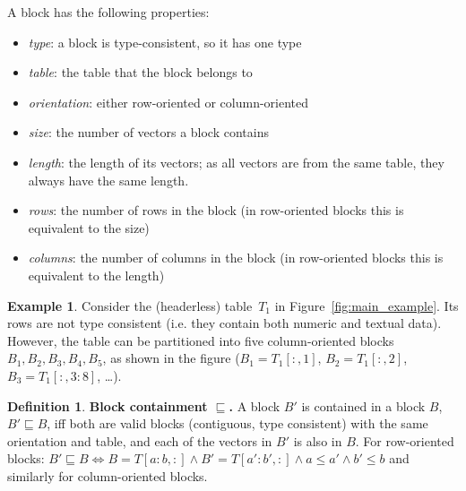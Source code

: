 \documentclass{IEEEtran}
\newcommand{\range}[3]{\ensuremath{#1[#2,#3]}}
\newcommand{\rangeto}[2]{#1{:}#2}
\newcommand{\rangeall}{:}
\newcommand{\sbs}{B}
\newcommand{\sbl}[1]{\ensuremath{\sbs_{\textit{#1}}}}
\theoremstyle{definition}
\newtheorem{definition}{Definition}
\newtheorem{example}{Example}
\begin{document}
A block has the following properties:
\begin{itemize}
\item \textit{type}: a block is type-consistent, so it has one type
\item \textit{table}: the table that the block belongs to
\item \textit{orientation}: either row-oriented or column-oriented
\item \textit{size}: the number of vectors a block contains
\item \textit{length}: the length of its vectors; as all vectors are from the same table, they always have the same length.
\item \textit{rows}: the number of rows in the block
(in row-oriented blocks this is equivalent to the size)
\item \textit{columns}: the number of columns in the block (in row-oriented blocks this is equivalent to the length)
\end{itemize}



\begin{example}
Consider the (headerless) table~$T_1$ in Figure~\ref{fig:main_example}.
Its rows are not type consistent (i.e. they contain both numeric and textual data).
However, the table can be partitioned into five column-oriented blocks $\sbl{1}, \sbl{2}, \sbl{3}, \sbl{4}, \sbl{5}$, as shown in the figure ($\sbl{1} = \range{T_1}{\rangeall}{1}$, $\sbl{2} = \range{T_1}{\rangeall}{2}$, $\sbl{3} = \range{T_1}{\rangeall}{\rangeto{3}{8}}$, \dots).
\end{example}

\begin{definition}
\textbf{Block containment $\sqsubseteq$.} 
A block $B'$ is contained in a block $B$, $B' \sqsubseteq B$, iff both are valid blocks (contiguous, type consistent) with the same orientation and table, and each of the vectors in $B'$ is also in $B$. For row-oriented blocks: $B' \sqsubseteq B \Leftrightarrow B=\range{T}{\rangeto{a}{b}}{\rangeall} \wedge B'=\range{T}{\rangeto{a'}{b'}}{\rangeall} \wedge a \leq a' \wedge b' \leq b$ and similarly for column-oriented blocks.
\end{definition}
\end{document}
